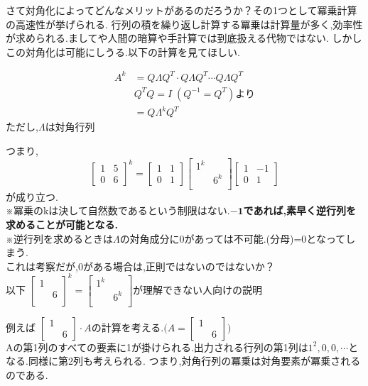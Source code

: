 さて対角化によってどんなメリットがあるのだろうか？その1つとして冪乗計算の高速性が挙げられる.
行列の積を繰り返し計算する冪乗は計算量が多く,効率性が求められる.ましてや人間の暗算や手計算では到底扱える代物ではない.
しかしこの対角化は可能にしうる.以下の計算を見てほしい.
\begin{tcolorbox}[colframe=black!80,colback=white,title=Aのk乗行列]
\begin{align*}   
A^k&=Q\Lambda Q^T\cdot Q\Lambda Q^T\cdots Q\Lambda Q^T\\
&\text{$Q^TQ=I\;(Q^{-1}=Q^T)$より}\\
&=Q\Lambda^k Q^T
\end{align*}
ただし,$\Lambda$は対角行列
\end{tcolorbox}
つまり,
\[
    \begin{bmatrix}
        1 & 5 \\ 0 & 6
    \end{bmatrix}^k=
    \begin{bmatrix}
        1 & 1 \\ 0 & 1
    \end{bmatrix}
    \begin{bmatrix}
        1^k & \\ & 6^k\\
    \end{bmatrix}
    \begin{bmatrix}
        1 & -1  \\ 0 & 1
    \end{bmatrix}
\]
が成り立つ.\\
※冪乗のkは決して自然数であるという制限はない.\textbf{$\mathbf{-1}$であれば,素早く逆行列を求めることが可能となる.}\\
※逆行列を求めるときは$\Lambda$の対角成分に0があっては不可能.(分母)\;=\;0となってしまう.\\
これは考察だが,0がある場合は,正則ではないのではないか？ \bigskip\\
\noindent
以下
$    \begin{bmatrix}
        1 & \\ & 6\\
    \end{bmatrix}^k=
    \begin{bmatrix}
        1^k & \\ & 6^k\\
    \end{bmatrix}$が理解できない人向けの説明
\begin{framed}
    
    例えば
$\begin{bmatrix}
    1 & \\ & 6
\end{bmatrix}\cdot A$の計算を考える.$\bigg(
    A=
    \begin{bmatrix}
        1 & \\ & 6
    \end{bmatrix}
\bigg)$\\
Aの第1列のすべての要素に1が掛けられる.出力される行列の第1列は$1^2,0,0,\cdots$となる.同様に第2列も考えられる.
つまり,対角行列の冪乗は対角要素が冪乗されるのである.\\
\end{framed}
